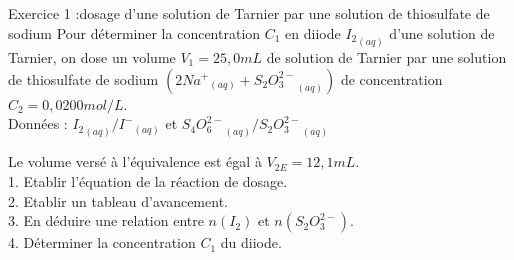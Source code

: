 \documentclass[12pt, french]{article}
\begin{document}
\begin{center}

\end{center}


   \begin{Box2}{Exercice 1 :dosage d'une solution de Tarnier par une solution de thiosulfate de sodium} 
      Pour déterminer la concentration $C_1$ en diiode ${I_2}_{(aq)}$ d’une solution de Tarnier, on dose un volume
      $V_1 =25,0 mL$ de solution de Tarnier par une solution de thiosulfate de sodium $(2{Na^+}_{(aq)} + {S_2O_3^{2-}}_{(aq)})$ de
concentration $C_2=0,0200 mol/L$.
      \\Données : ${I_2}_{(aq)} / {I^-}_{(aq)}$ et ${S_4O_6^{2-}}_{(aq)} / {S_2O_3^{2-}}_{(aq)}$

      Le volume versé à l’équivalence est égal à $V_{2E}=12,1 mL$.
\\1. Etablir l’équation de la réaction de dosage.
\\2. Etablir un tableau d’avancement.
      \\3. En déduire une relation entre $n(I_2)$ et $n(S_2O_3^{2-})$.
\\4. Déterminer la concentration $C_1$ du diiode.


   \end{Box2}
\end{document}
